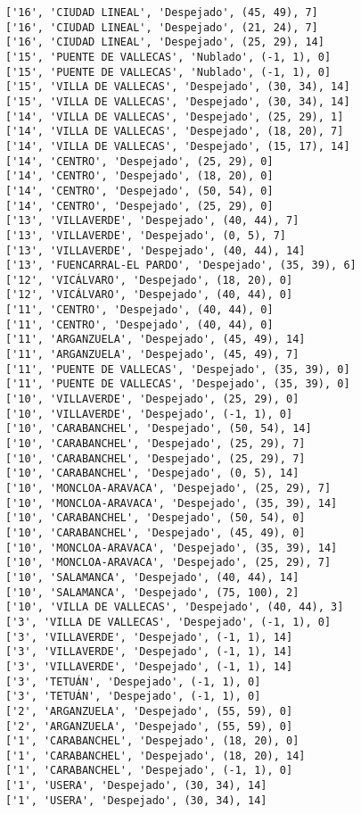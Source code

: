 \documentclass[11pt]{article}
\begin{document}
\begin{Verbatim}[commandchars=\\\{\}]
['16', 'CIUDAD LINEAL', 'Despejado', (45, 49), 7]
['16', 'CIUDAD LINEAL', 'Despejado', (21, 24), 7]
['16', 'CIUDAD LINEAL', 'Despejado', (25, 29), 14]
['15', 'PUENTE DE VALLECAS', 'Nublado', (-1, 1), 0]
['15', 'PUENTE DE VALLECAS', 'Nublado', (-1, 1), 0]
['15', 'VILLA DE VALLECAS', 'Despejado', (30, 34), 14]
['15', 'VILLA DE VALLECAS', 'Despejado', (30, 34), 14]
['14', 'VILLA DE VALLECAS', 'Despejado', (25, 29), 1]
['14', 'VILLA DE VALLECAS', 'Despejado', (18, 20), 7]
['14', 'VILLA DE VALLECAS', 'Despejado', (15, 17), 14]
['14', 'CENTRO', 'Despejado', (25, 29), 0]
['14', 'CENTRO', 'Despejado', (18, 20), 0]
['14', 'CENTRO', 'Despejado', (50, 54), 0]
['14', 'CENTRO', 'Despejado', (25, 29), 0]
['13', 'VILLAVERDE', 'Despejado', (40, 44), 7]
['13', 'VILLAVERDE', 'Despejado', (0, 5), 7]
['13', 'VILLAVERDE', 'Despejado', (40, 44), 14]
['13', 'FUENCARRAL-EL PARDO', 'Despejado', (35, 39), 6]
['12', 'VICÁLVARO', 'Despejado', (18, 20), 0]
['12', 'VICÁLVARO', 'Despejado', (40, 44), 0]
['11', 'CENTRO', 'Despejado', (40, 44), 0]
['11', 'CENTRO', 'Despejado', (40, 44), 0]
['11', 'ARGANZUELA', 'Despejado', (45, 49), 14]
['11', 'ARGANZUELA', 'Despejado', (45, 49), 7]
['11', 'PUENTE DE VALLECAS', 'Despejado', (35, 39), 0]
['11', 'PUENTE DE VALLECAS', 'Despejado', (35, 39), 0]
['10', 'VILLAVERDE', 'Despejado', (25, 29), 0]
['10', 'VILLAVERDE', 'Despejado', (-1, 1), 0]
['10', 'CARABANCHEL', 'Despejado', (50, 54), 14]
['10', 'CARABANCHEL', 'Despejado', (25, 29), 7]
['10', 'CARABANCHEL', 'Despejado', (25, 29), 7]
['10', 'CARABANCHEL', 'Despejado', (0, 5), 14]
['10', 'MONCLOA-ARAVACA', 'Despejado', (25, 29), 7]
['10', 'MONCLOA-ARAVACA', 'Despejado', (35, 39), 14]
['10', 'CARABANCHEL', 'Despejado', (50, 54), 0]
['10', 'CARABANCHEL', 'Despejado', (45, 49), 0]
['10', 'MONCLOA-ARAVACA', 'Despejado', (35, 39), 14]
['10', 'MONCLOA-ARAVACA', 'Despejado', (25, 29), 7]
['10', 'SALAMANCA', 'Despejado', (40, 44), 14]
['10', 'SALAMANCA', 'Despejado', (75, 100), 2]
['10', 'VILLA DE VALLECAS', 'Despejado', (40, 44), 3]
['3', 'VILLA DE VALLECAS', 'Despejado', (-1, 1), 0]
['3', 'VILLAVERDE', 'Despejado', (-1, 1), 14]
['3', 'VILLAVERDE', 'Despejado', (-1, 1), 14]
['3', 'VILLAVERDE', 'Despejado', (-1, 1), 14]
['3', 'TETUÁN', 'Despejado', (-1, 1), 0]
['3', 'TETUÁN', 'Despejado', (-1, 1), 0]
['2', 'ARGANZUELA', 'Despejado', (55, 59), 0]
['2', 'ARGANZUELA', 'Despejado', (55, 59), 0]
['1', 'CARABANCHEL', 'Despejado', (18, 20), 0]
['1', 'CARABANCHEL', 'Despejado', (18, 20), 14]
['1', 'CARABANCHEL', 'Despejado', (-1, 1), 0]
['1', 'USERA', 'Despejado', (30, 34), 14]
['1', 'USERA', 'Despejado', (30, 34), 14]

\end{Verbatim}
\end{document}
